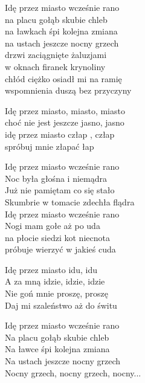 \begin{text}
    Idę przez miasto wcześnie rano\\
    na placu gołąb skubie chleb\\
    na ławkach śpi kolejna zmiana\\
    na ustach jeszcze nocny grzech\\
    drzwi zaciągnięte żaluzjami\\
    w oknach firanek krynoliny\\
    chłód ciężko osiadł mi na ramię\\
    wspomnienia duszą bez przyczyny

    Idę przez miasto, miasto, miasto\\
    choć nie jest jeszcze jasno, jasno\\
    idę przez miasto człap , człap\\
    spróbuj mnie złapać łap

    Idę przez miasto wcześnie rano\\
    Noc była głośna i niemądra\\
    Już nie pamiętam co się stało\\
    Skumbrie w tomacie zdechła flądra\\
    Idę przez miasto wcześnie rano\\
    Nogi mam gołe aż po uda\\
    na płocie siedzi kot niecnota\\
    próbuje wierzyć w jakieś cuda

    Idę przez miasto idu, idu\\
    A za mną idzie, idzie, idzie\\
    Nie goń mnie proszę, proszę\\
    Daj mi szaleństwo aż do świtu

    Idę przez miasto wcześnie rano\\
    Na placu gołąb skubie chleb\\
    Na ławce śpi kolejna zmiana\\
    Na ustach jeszcze nocny grzech\\
    Nocny grzech, nocny grzech, nocny...
\end{text}
\begin{chord}

\end{chord}
